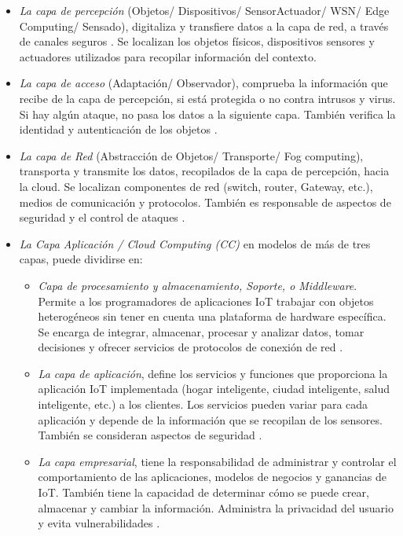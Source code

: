     \begin{itemize}
        \item \textit{La capa de percepción} (Objetos/ Dispositivos/ SensorActuador/ WSN/ Edge Computing/ Sensado), digitaliza y transfiere datos a la capa de red, a través de canales seguros \cite{internetOfThingsStateOfTheArt}. Se localizan los objetos físicos, dispositivos sensores y actuadores utilizados para recopilar información del contexto.
        \item \textit{La capa de acceso} (Adaptación/ Observador), comprueba la información que recibe de la capa de percepción, si está protegida o no contra intrusos y virus. Si hay algún ataque, no pasa los datos a la siguiente capa. También verifica la identidad y autenticación de los objetos \cite{internetOfThingsStateOfTheArt}.
        \item \textit{La capa de Red} (Abstracción de Objetos/ Transporte/ Fog computing), transporta y transmite los datos, recopilados de la capa de percepción, hacia la cloud. Se localizan componentes de red (switch, router, Gateway, etc.), medios de comunicación y protocolos. También es responsable de aspectos de seguridad y el control de ataques \cite{internetOfThingsStateOfTheArt}.
        \item \textit{La Capa Aplicación / Cloud Computing (CC)} en modelos de más de tres capas, puede dividirse en:
            \begin{itemize}
                \item \textit{Capa de procesamiento y almacenamiento, Soporte, o Middleware}. Permite a los programadores de aplicaciones IoT trabajar con objetos heterogéneos sin tener en cuenta una plataforma de hardware específica. Se encarga de integrar, almacenar, procesar y analizar datos, tomar decisiones y ofrecer servicios de protocolos de conexión de red \cite{internetOfThingsStateOfTheArt}.
                \item \textit{La capa de aplicación}, define los servicios y funciones que proporciona la aplicación IoT implementada (hogar inteligente, ciudad inteligente, salud inteligente, etc.) a los clientes. Los servicios pueden variar para cada aplicación y depende de la información que se recopilan de los sensores. También se consideran aspectos de seguridad \cite{internetOfThingsStateOfTheArt}.
                \item \textit{La capa empresarial}, tiene la responsabilidad de administrar y controlar el comportamiento de las aplicaciones, modelos de negocios y ganancias de IoT. También tiene la capacidad de determinar cómo se puede crear, almacenar y cambiar la información. Administra la privacidad del usuario y evita vulnerabilidades \cite{internetOfThingsStateOfTheArt}.\\\\\\\\
            \end{itemize} 
    \end{itemize}

